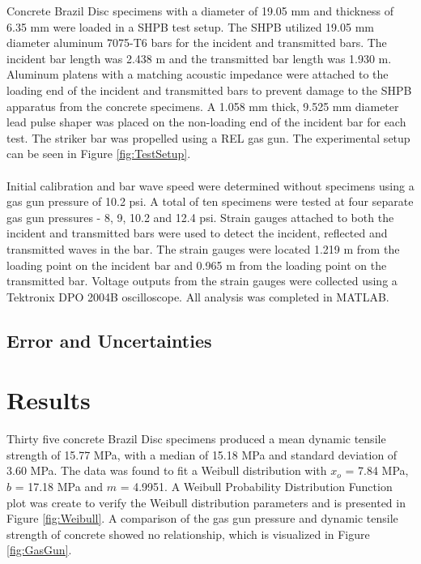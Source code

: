 \documentclass[12pt]{article}
\begin{document}
Concrete Brazil Disc specimens with a diameter of 19.05 mm and thickness of 6.35 mm were loaded in a SHPB test setup. The SHPB utilized 19.05 mm diameter aluminum 7075-T6 bars for the incident and transmitted bars. The incident bar length was 2.438 m and the transmitted bar length was 1.930 m. Aluminum platens with a matching acoustic impedance were attached to the loading end of the incident and transmitted bars to prevent damage to the SHPB apparatus from the concrete specimens. A 1.058 mm thick, 9.525 mm diameter lead pulse shaper was placed on the non-loading end of the incident bar for each test. The striker bar was propelled using a REL gas gun. The experimental setup can be seen in Figure \ref{fig:TestSetup}.
\\ \\
Initial calibration and bar wave speed were determined without specimens using a gas gun pressure of 10.2 psi. A total of ten specimens were tested at four separate gas gun pressures - 8, 9, 10.2 and 12.4 psi. Strain gauges attached to both the incident and transmitted bars were used to detect the incident, reflected and transmitted waves in the bar. The strain gauges were located 1.219 m from the loading point on the incident bar and 0.965 m from the loading point on the transmitted bar. Voltage outputs from the strain gauges were collected using a Tektronix DPO 2004B oscilloscope. All analysis was completed in MATLAB.   

\subsection{Error and Uncertainties} %

\section{Results} %

Thirty five concrete Brazil Disc specimens produced a mean dynamic tensile strength of 15.77 MPa, with a median of 15.18 MPa and standard deviation of 3.60 MPa. The data was found to fit a Weibull distribution with $x_{o}$ = 7.84 MPa, $b$ = 17.18 MPa and $m$ = 4.9951. A Weibull Probability Distribution Function plot was create to verify the Weibull distribution parameters and is presented in Figure \ref{fig:Weibull}. A comparison of the gas gun pressure and dynamic tensile strength of concrete showed no relationship, which is visualized in Figure \ref{fig:GasGun}.
\end{document}

